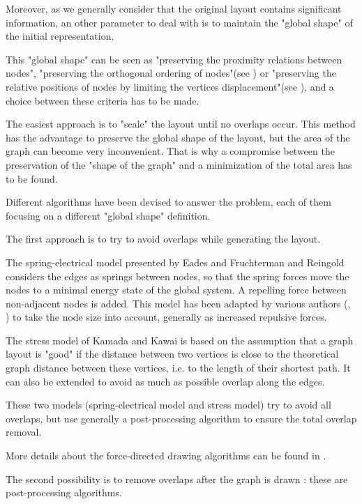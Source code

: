 \documentclass[12pt]{report}
\begin{document}
Moreover, as we generally consider that the original layout contains significant information, an other parameter to deal with is to maintain the "global shape" of the initial representation. 

This "global shape" can be seen as "preserving the proximity relations between nodes", "preserving the orthogonal ordering of nodes"(see \cite{Mis95}) or "preserving the relative positions of nodes by limiting the vertices displacement"(see \cite{Gansner98}), and a choice between these criteria has to be made.

The easiest approach is to "scale" the layout until no overlaps occur. This method has the advantage to preserve the global shape of the layout, but the area of the graph can become very inconvenient. That is why a compromise between the preservation of the "shape of the graph" and a minimization of the total area has to be found.

Different algorithms have been devised to answer the problem, each of them focusing on a different "global shape" definition. 

\bigskip
The first approach is to try to avoid overlaps while generating the layout.

The spring-electrical model presented by Eades \cite{Eades84} and Fruchterman and Reingold \cite{FR91} considers the edges as springs between nodes, so that the spring forces move the nodes to a minimal energy state of the global system. A repelling force between non-adjacent nodes is added.
This model has been adapted by various authors (\cite{HK02}, \cite{Li05}) to take the node size into account, generally as increased repulsive forces.

The stress model of Kamada and Kawai \cite{Kamada89} is based on the assumption that a graph layout is "good" if the distance between two vertices is close to the theoretical graph distance between these vertices, i.e. to the length of their shortest path. It can also be extended to avoid as much as possible overlap along the edges.

These two models (spring-electrical model and stress model) try to avoid all overlaps, but use generally a post-processing algorithm to ensure the total overlap removal.

More details about the force-directed drawing algorithms can be found in \cite{Kob13}.

\bigskip
The second possibility is to remove overlaps after the graph is drawn : these are post-processing algorithms.
\end{document}
